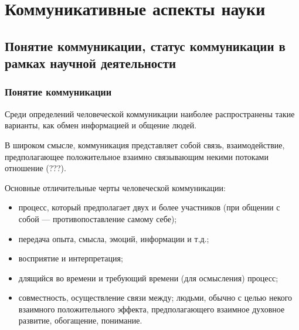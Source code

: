 \section{Коммуникативные аспекты науки} 

\subsection{Понятие коммуникации, статус коммуникации в рамках научной деятельности}

\subsubsection{Понятие коммуникации}




Среди определений человеческой коммуникации наиболее
распространены такие варианты, как обмен информацией и общение людей. 

В широком смысле, коммуникация представляет собой связь, взаимодействие,
предполагающее положительное взаимно связывающим некими потоками отношение (???).

Основные отличительные черты человеческой коммуникации:
\begin{itemize}
    \item процесс, который предполагает двух и более участников (при общении с собой --- противопоставление самому себе);
    \item передача опыта, смысла, эмоций, информации и т.д.;
    \item восприятие и интерпретация;
    \item длящийся во времени и требующий времени (для осмысления) процесс;
    \item совместность, осуществление связи между;
    людьми, обычно с целью некого взаимного положительного эффекта, предполагающего
    взаимное духовное развитие, обогащение, понимание.
\end{itemize}

